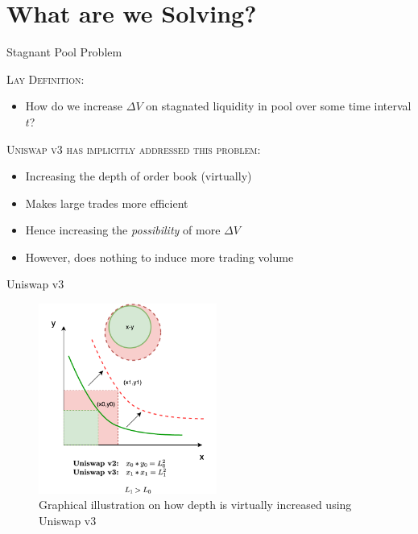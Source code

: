 \documentclass[10pt,xcolor=svgnames]{beamer} %
\begin{document}
\section{What are we Solving?}

\begin{frame}{Stagnant Pool Problem} 

\begin{exampleblock}{\textsc{Lay Definition:}}
\begin{itemize}
  \item How do we increase $\Delta V$ on stagnated liquidity in pool over some time interval $t$?
\end{itemize}
\end{exampleblock}

\begin{exampleblock}{\textsc{Uniswap v3 has implicitly addressed this problem:}}
\begin{itemize}
  \item Increasing the depth of order book (virtually)
  \item Makes large trades more efficient
  \item Hence increasing the \textit{possibility} of more $\Delta V$
  \item However, does nothing to induce more trading volume
\end{itemize}
\end{exampleblock}


\end{frame}


\begin{frame}{Uniswap v3} 

\begin{figure}[h!]
\includegraphics[width=2.3in]{img/uniswap_v3.png}
\caption{Graphical illustration on how depth is virtually increased using Uniswap v3} 
\label{fig:uniswap_v3}
\end{figure}

\end{frame}
\end{document}
